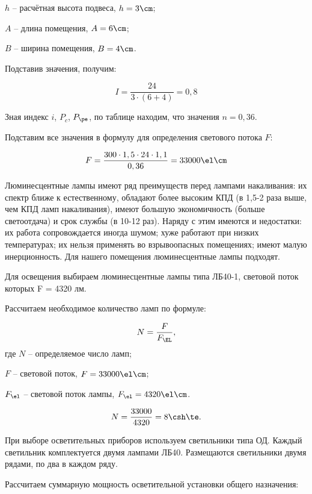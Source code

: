 $h$ -- расчётная высота подвеса, $h = 3 \cm$;

$A$ -- длина помещения, $A = 6 \cm$;

$B$ -- ширина помещения, $B = 4 \cm$.

Подставив значения, получим:

\begin{equation*}
	I = \frac{24}{3 \cdot (6 + 4)} = 0,8
\end{equation*}

Зная индекс $i$, $P_c$, $P_{\pe}$, по таблице находим, что значения $n = 0,36$.

Подставим все значения в формулу для определения светового потока $F$:

\begin{equation*}
	F = \frac{300 \cdot 1,5 \cdot 24 \cdot 1,1}{0,36} = 33000 \el\cm
\end{equation*}

Люминесцентные лампы имеют ряд преимуществ перед лампами накаливания: их спектр ближе к естественному, обладают более высоким КПД (в 1,5-2 раза выше, чем КПД ламп накаливания), имеют большую экономичность (больше светоотдача) и срок службы (в 10-12 раз). Наряду с этим имеются и недостатки: их работа сопровождается иногда шумом; хуже работают при низких температурах; их нельзя применять во взрывоопасных помещениях; имеют малую инерционность. Для нашего помещения люминесцентные лампы подходят.

Для освещения выбираем люминесцентные лампы типа ЛБ40-1, световой поток которых F = 4320 лм. 

Рассчитаем необходимое количество ламп по формуле:

\begin{equation*}
	N = \frac{F}{F_{\EL}},
\end{equation*}
где $N$ -- определяемое число ламп;

$F$ -- световой поток, $F = 33000 \el\cm$;

$F_{\el}$ -- световой поток лампы, $F_{\el} = 4320 \el\cm$.

\begin{equation*}
	N = \frac{33000}{4320} = 8 \csh\te.
\end{equation*}

При выборе осветительных приборов используем светильники типа ОД. Каждый светильник комплектуется двумя лампами ЛБ40. Размещаются светильники двумя рядами, по два в каждом ряду.

Рассчитаем суммарную мощность осветительной установки общего назначения:

